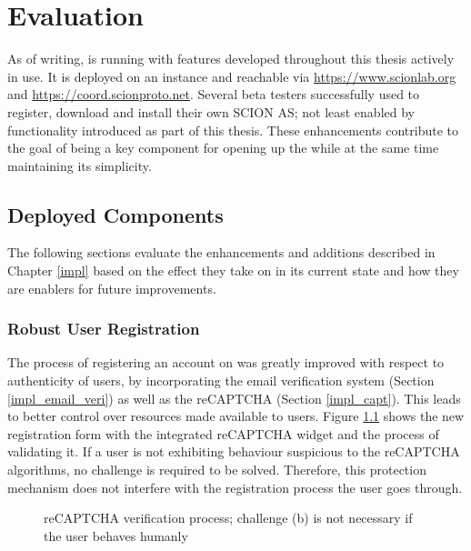 \chapter{Evaluation}

As of writing, \lcs is running with features developed throughout this thesis actively in use. It is deployed on an  instance and reachable via \url{https://www.scionlab.org} and \url{https://coord.scionproto.net}. Several beta testers successfully used \lcs to register, download and install their own SCION AS; not least enabled by functionality introduced as part of this thesis. These enhancements contribute to the goal of \lcs being a key component for opening up the \lee while at the same time maintaining its simplicity.


\section{Deployed Components}

The following sections evaluate the enhancements and additions described in Chapter \ref{impl} based on the effect they take on \lcs in its current state and how they are enablers for future improvements.

\subsection{Robust User Registration}
\label{eva:regi}

The process of registering an account on \lcs was greatly improved with respect to authenticity of users, by incorporating the email verification system (Section \ref{impl_email_veri}) as well as the reCAPTCHA (Section \ref{impl_capt}). This leads to better control over resources made available to users. Figure \ref{capt:veri_process} shows the new registration form with the integrated reCAPTCHA widget and the process of validating it. If a user is not exhibiting behaviour suspicious to the reCAPTCHA algorithms, no challenge is required to be solved. Therefore, this protection mechanism does not interfere with the registration process the user goes through.

\begin{figure}%
	\centering
	\caption{reCAPTCHA verification process; challenge (b) is not necessary if the user behaves humanly}%
	\label{capt:veri_process}%
\end{figure}

